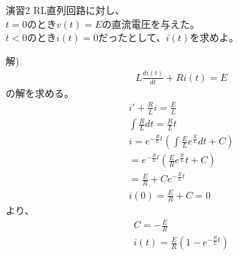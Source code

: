 \documentclass{jsarticle}
\begin{document}
\begin{itembox}[l]{演習2}
RL直列回路に対し、\\
$t=0$のとき$v(t)=E$の直流電圧を与えた。\\
$t<0$のとき$i(t)=0$だったとして、$i(t)$を求めよ。
\end{itembox}
解)\\
\begin{eqnarray}
L\frac{di(t)}{dt}+Ri(t)=E
\end{eqnarray}
の解を求める。
\begin{eqnarray}
i'+\frac{R}{L}i=\frac{E}{L}\\
\int \frac{R}{L}dt=\frac{R}{L}t\\
i=e^{-\frac{R}{L}t}\left(\int \frac{E}{L}e^{\frac{R}{L}}dt+C\right)\\
=e^{-\frac{R}{L}t}\left(\frac{E}{R}e^{\frac{R}{L}}t+C\right)\\
=\frac{E}{R}+Ce^{-\frac{R}{L}t}\\
i(0)=\frac{E}{R}+C=0
\end{eqnarray}
より、
\begin{eqnarray}
C=-\frac{E}{R}\\
i(t)=\frac{E}{R}\left(1-e^{-\frac{R}{L}t}\right)
\end{eqnarray}
\clearpage
\end{document}
